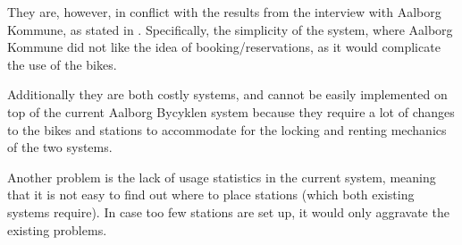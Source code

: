 They are, however, in conflict with the results from the interview with Aalborg Kommune, as stated in .
Specifically, the simplicity of the system, where Aalborg Kommune did not like the idea of booking/reservations, as it would complicate the use of the bikes.

Additionally they are both costly systems, and cannot be easily implemented on top of the current Aalborg Bycyklen system because they require a lot of changes to the bikes and stations to accommodate for the locking and renting mechanics of the two systems.

Another problem is the lack of usage statistics in the current system, meaning that it is not easy to find out where to place stations (which both existing systems require).
In case too few stations are set up, it would only aggravate the existing problems.
